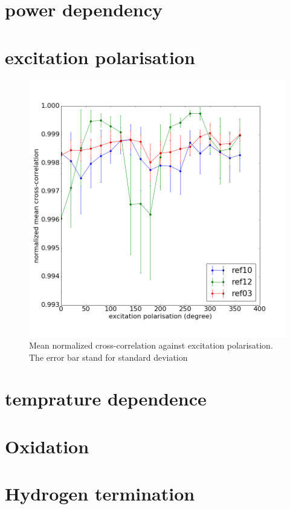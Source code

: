 \section{power dependency}

\section{excitation polarisation}
\begin{figure}[h]
\centering
\includegraphics[width=0.7\linewidth]{"Figures/pic/excitation polarisation"}
\caption{Mean normalized cross-correlation against excitation polarisation. The error bar stand for standard deviation}
\label{fig:excitation-polarisation}
\end{figure}

 
\section{temprature dependence}

\section{Oxidation}

\section{Hydrogen termination}


